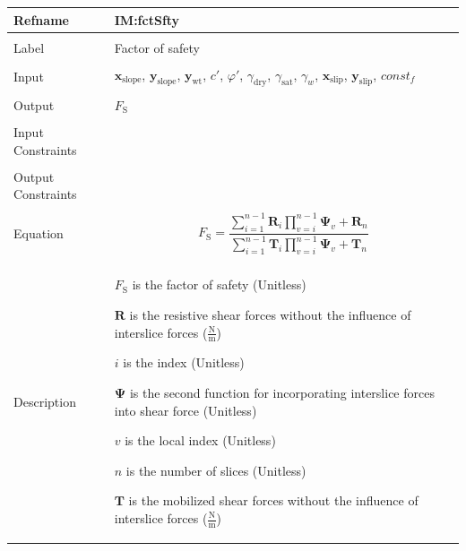 \documentclass[12pt]{article}
\begin{document}
\noindent \begin{minipage}{\textwidth}
\begin{tabular}{>{\raggedright}p{}>{\raggedright\arraybackslash}p{}}
\toprule \textbf{Refname} & \textbf{IM:fctSfty}
\label{IM:fctSfty}
\\ \midrule \\
Label & Factor of safety
\\ \midrule \\
Input & ${\mathbf{x}_{\text{slope}}}$, ${\mathbf{y}_{\text{slope}}}$, ${\mathbf{y}_{\text{wt}}}$, $c'$, $φ'$, ${γ_{\text{dry}}}$, ${γ_{\text{sat}}}$, ${γ_{w}}$, ${\mathbf{x}_{\text{slip}}}$, ${\mathbf{y}_{\text{slip}}}$, $const_f$
\\ \midrule \\
Output & ${F_{\text{S}}}$
\\ \midrule \\
Input Constraints & 
\\ \midrule \\
Output Constraints & 
\\ \midrule \\
Equation & \begin{displaymath}
           {F_{\text{S}}}=\frac{\displaystyle\sum_{i=1}^{n-1}{{\mathbf{R}}_{i} \displaystyle\prod_{v=i}^{n-1}{{\mathbf{Ψ}}_{v}}}+{\mathbf{R}}_{n}}{\displaystyle\sum_{i=1}^{n-1}{{\mathbf{T}}_{i} \displaystyle\prod_{v=i}^{n-1}{{\mathbf{Ψ}}_{v}}}+{\mathbf{T}}_{n}}
           \end{displaymath}
\\ \midrule \\
Description & \begin{symbDescription}
              \item{${F_{\text{S}}}$ is the factor of safety (Unitless)}
              \item{$\mathbf{R}$ is the resistive shear forces without the influence of interslice forces ($\frac{\text{N}}{\text{m}}$)}
              \item{$i$ is the index (Unitless)}
              \item{$\mathbf{Ψ}$ is the second function for incorporating interslice forces into shear force (Unitless)}
              \item{$v$ is the local index (Unitless)}
              \item{$n$ is the number of slices (Unitless)}
              \item{$\mathbf{T}$ is the mobilized shear forces without the influence of interslice forces ($\frac{\text{N}}{\text{m}}$)}

\end{symbDescription}
\end{tabular}
\end{minipage}
\end{document}
